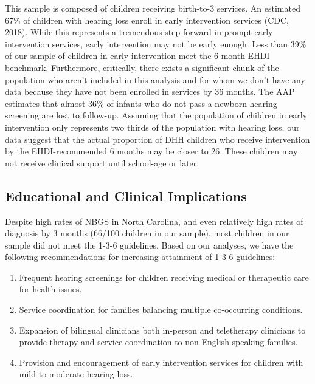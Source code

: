 \documentclass[english,man]{apa6}
\begin{document}
This sample is composed of children receiving birth-to-3 services. An estimated 67\% of children with hearing loss enroll in early intervention services (CDC, 2018). While this represents a tremendous step forward in prompt early intervention services, early intervention may not be early enough. Less than 39\% of our sample of children in early intervention meet the 6-month EHDI benchmark. Furthermore, critically, there exists a significant chunk of the population who aren't included in this analysis and for whom we don't have any data because they have not been enrolled in services by 36 months. The AAP estimates that almost 36\% of infants who do not pass a newborn hearing screening are lost to follow-up. Assuming that the population of children in early intervention only represents two thirds of the population with hearing loss, our data suggest that the actual proportion of DHH children who receive intervention by the EHDI-recommended 6 months may be closer to 26. These children may not receive clinical support until school-age or later.

\hypertarget{educational-and-clinical-implications}{%
\subsection{Educational and Clinical Implications}\label{educational-and-clinical-implications}}

Despite high rates of NBGS in North Carolina, and even relatively high rates of diagnosis by 3 months (66/100 children in our sample), most children in our sample did not meet the 1-3-6 guidelines. Based on our analyses, we have the following recommendations for increasing attainment of 1-3-6 guidelines:

\begin{enumerate}

\item Frequent hearing screenings for children receiving medical or therapeutic care for health issues.
\item Service coordination for families balancing multiple co-occurring conditions.
\item Expansion of bilingual clinicians both in-person and teletherapy clinicians to provide therapy and service coordination to non-English-speaking families.
\item Provision and encouragement of early intervention services for children with mild to moderate hearing loss.

\end{enumerate}
\end{document}
